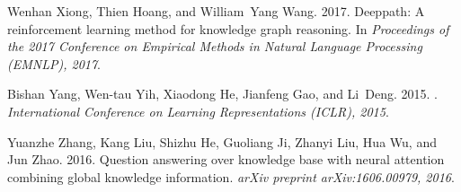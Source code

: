 \documentclass[11pt,a4paper]{article}
\begin{document}
\begin{thebibliography}{29}
Wenhan Xiong, Thien Hoang, and William~Yang Wang. 2017.
\newblock Deeppath: A reinforcement learning method for knowledge graph
  reasoning.
\newblock In \emph{Proceedings of the 2017 Conference on Empirical Methods in
  Natural Language Processing (EMNLP), 2017}.

Bishan Yang, Wen-tau Yih, Xiaodong He, Jianfeng Gao, and Li~Deng. 2015.
.
\newblock \emph{International Conference on Learning Representations (ICLR),
  2015}.

Yuanzhe Zhang, Kang Liu, Shizhu He, Guoliang Ji, Zhanyi Liu, Hua Wu, and Jun
  Zhao. 2016.
\newblock Question answering over knowledge base with neural attention
  combining global knowledge information.
\newblock \emph{arXiv preprint arXiv:1606.00979, 2016}.

\end{thebibliography}
\end{document}
